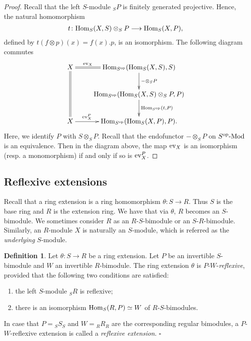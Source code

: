 \documentclass[a4paper]{amsart}
\theoremstyle{definition}
\newtheorem{defn}[thm]{Definition}
\theoremstyle{remark}
\numberwithin{equation}{section}
\begin{document}
\begin{proof}
Recall that the left $S$-module $_SP$ is finitely generated projective. Hence, the natural homomorphism
 \begin{align}\label{equ:2}
 t\colon {\rm Hom}_S(X, S)\otimes_SP\longrightarrow{\rm Hom}_S(X, P),\end{align}
 defined by $t(f\otimes p)(x)=f(x).p$, is an isomorphism. The following diagram commutes
\[\xymatrix{
X\ar@{=}[dd] \ar@{=}[r]^-{{\rm ev}_X} & {\rm Hom}_{S^{\rm op}}({\rm Hom}_S(X, S), S)\ar[d]^-{-\otimes_S P} \\
& {\rm Hom}_{S^{\rm op}}({\rm Hom}_S(X, S)\otimes_S P, P) \ar[d]^-{{\rm Hom}_{S^{\rm op}}(t, P)} \\
X \ar[r]^-{{\rm ev}_X^P} & {\rm Hom}_{S^{\rm op}}({\rm Hom}_S(X, P), P).
}\]
Here, we identify $P$ with $S\otimes_S P$. Recall that the endofunctor $-\otimes_SP$ on $S^{\rm op}\mbox{-Mod}$ is an equivalence. Then in the diagram above,
the map ${\rm ev}_X$ is an isomorphism (resp. a monomorphism) if and only if so is ${
\rm ev}_X^P$.
\end{proof}

\subsection{Reflexive extensions} Recall that a ring extension is a ring homomorphism $\theta\colon S\rightarrow R$.  Thus $S$ is the base ring and $R$ is the extension ring. We have that via $\theta$, $R$ becomes an $S$-bimodule. We sometimes consider $R$ as an $R$-$S$-bimodule or an $S$-$R$-bimodule. Similarly, an $R$-module $X$ is naturally an $S$-module, which is referred as  the \emph{underlying} $S$-module.

 \begin{defn}\label{defn:1} Let $\theta\colon S\rightarrow R$ be a ring extension. Let $P$ be an invertible $S$-bimodule and
 $W$ an invertible $R$-bimodule. The ring extension $\theta$ is  $P$-$W$-\emph{reflexive}, provided that the following two conditions are satisfied:
 \begin{enumerate}
 \item the left $S$-module $_SR$ is reflexive;
 \item there is an isomorphism ${\rm Hom}_S(R, P)\simeq W$ of $R$-$S$-bimodules.
 \end{enumerate}
 In case that $P={_SS_S}$ and $W={_RR_R}$ are the corresponding regular bimodules, a $P$-$W$-reflexive extension is called a \emph{reflexive extension}. \hfill $\square$
 \end{defn}
\end{document}
